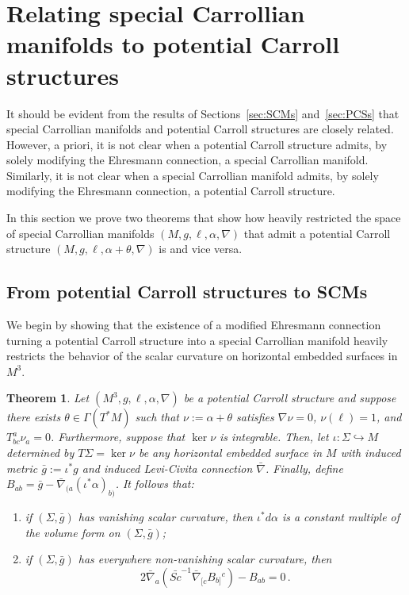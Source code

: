 \documentclass{article}
\newtheorem{theorem}{Theorem}[section]
\theoremstyle{definition}
\theoremstyle{remark}
\begin{document}
\section{Relating special Carrollian manifolds to potential Carroll structures} \label{sec:relations}

It should be evident from the results of Sections~\ref{sec:SCMs} and~\ref{sec:PCSs} that special Carrollian manifolds and potential Carroll structures are closely related. However, a priori, it is not clear when a potential Carroll structure admits, by solely modifying the Ehresmann connection, a special Carrollian manifold. Similarly, it is not clear when a special Carrollian manifold admits, by solely modifying the Ehresmann connection, a potential Carroll structure.

In this section we prove two theorems that show how heavily restricted the space of special Carrollian manifolds $(M,g,\ell,\alpha,\nabla)$  that admit a potential Carroll structure $(M,g,\ell,\alpha+\theta,\nabla)$ is and vice versa.

\subsection{From potential Carroll structures to SCMs}
We begin by showing that the existence of a modified Ehresmann connection turning a potential Carroll structure into a special Carrollian manifold heavily restricts the behavior of the scalar curvature on horizontal embedded surfaces in $M^3$.
\begin{theorem} \label{thm:PCS-to-SCMs}
    Let $(M^3,g,\ell,\alpha,\nabla)$ be a potential Carroll structure and suppose there exists $\theta \in \Gamma(T^* M)$ such that $\nu:= \alpha + \theta$ satisfies $\nabla \nu = 0$, $\nu(\ell) = 1$, and $T^a_{bc} \nu_a = 0$. Furthermore, suppose that $\ker \nu$ is integrable. Then, let $\iota : \Sigma \hookrightarrow M$ determined by $T \Sigma = \ker \nu$ be any horizontal embedded surface in $M$ with induced metric $\bar{g} := \iota^*g$ and induced Levi-Civita connection $\bar{\nabla}$. Finally, define $B_{ab} = \bar{g} - \bar{\nabla}_{(a} (\iota^* \alpha)_{b)}$. It follows that:
    \begin{enumerate}
        \item if $(\Sigma, \bar{g})$ has vanishing scalar curvature, then $\iota^* d \alpha$ is a constant multiple of the volume form on $(\Sigma,\bar{g})$;
        \item if $(\Sigma,\bar{g})$ has everywhere non-vanishing scalar curvature, then
        $$2 \bar{\nabla}_a (\bar{Sc}^{-1} \bar{\nabla}_{[c} B_{b]}{}^c) - B_{ab} = 0\,. $$
    \end{enumerate}
\end{theorem}
\end{document}
